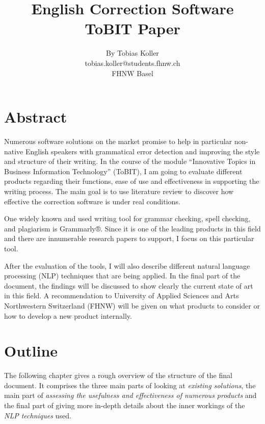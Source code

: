 \documentclass[a4paper,12pt,titlepage]{article}
\begin{document}
\title{\Large{\textbf{English Correction Software}}\\ ToBIT Paper}
\author{By Tobias Koller \\ tobias.koller@students.fhnw.ch \\ FHNW Basel}

\maketitle
\let\cleardoublepage\clearpage
{}

\section{Abstract}
Numerous software solutions on the market promise to help in particular non-native English speakers with grammatical error detection and improving the style and structure of their writing. In the course of the module ``Innovative Topics in Business Information Technology'' (ToBIT), I am going to evaluate different products regarding their functions, ease of use and effectiveness in supporting the writing process. The main goal is to use literature review to discover how effective the correction software is under real conditions.

One widely known and used writing tool for grammar checking, spell checking, and plagiarism is Grammarly®. Since it is one of the leading products in this field and there are innumerable research papers to support, I focus on this particular tool.

After the evaluation of the tools, I will also describe different natural language processing (NLP) techniques that are being applied. In the final part of the document, the findings will be discussed to show clearly the current state of art in this field. A recommendation to University of Applied Sciences and Arts Northwestern Switzerland (FHNW) will be given on what products to consider or how to develop a new product internally.

\newpage


\tableofcontents
\newpage



\section{Outline}\label{sec:outl}
The following chapter gives a rough overview of the structure of the final document. It comprises the three main parts of looking at \textit{existing solutions}, the main part of \textit{assessing the usefulness and effectiveness of numerous products} and the final part of giving more in-depth details about the inner workings of the \textit{NLP techniques} used.
\end{document}
